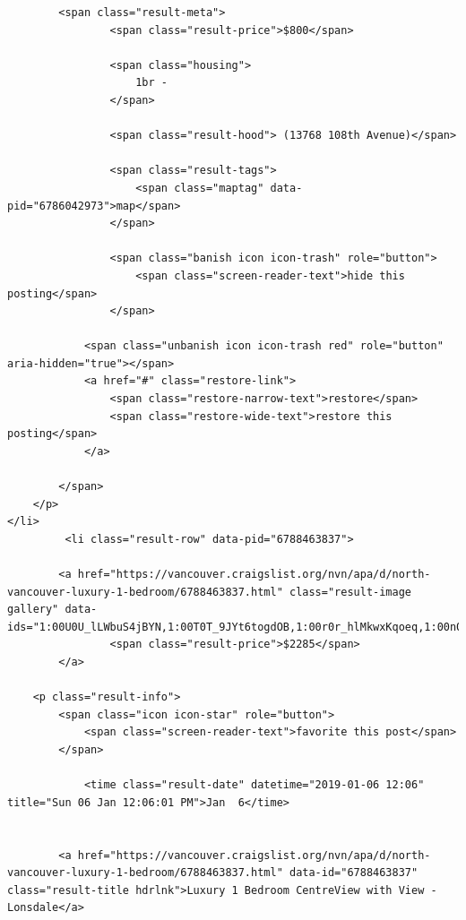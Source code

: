 \documentclass[
]{krantz}
\begin{document}
\begin{verbatim}
        <span class="result-meta">
                <span class="result-price">$800</span>

                <span class="housing">
                    1br -
                </span>

                <span class="result-hood"> (13768 108th Avenue)</span>

                <span class="result-tags">
                    <span class="maptag" data-pid="6786042973">map</span>
                </span>

                <span class="banish icon icon-trash" role="button">
                    <span class="screen-reader-text">hide this posting</span>
                </span>

            <span class="unbanish icon icon-trash red" role="button" aria-hidden="true"></span>
            <a href="#" class="restore-link">
                <span class="restore-narrow-text">restore</span>
                <span class="restore-wide-text">restore this posting</span>
            </a>

        </span>
    </p>
</li>
         <li class="result-row" data-pid="6788463837">

        <a href="https://vancouver.craigslist.org/nvn/apa/d/north-vancouver-luxury-1-bedroom/6788463837.html" class="result-image gallery" data-ids="1:00U0U_lLWbuS4jBYN,1:00T0T_9JYt6togdOB,1:00r0r_hlMkwxKqoeq,1:00n0n_2U8StpqVRYX,1:00M0M_e93iEG4BRAu,1:00a0a_PaOxz3JIfI,1:00o0o_4VznEcB0NC5,1:00V0V_1xyllKkwa9A,1:00G0G_lufKMygCGj6,1:00202_lutoxKbVTcP,1:00R0R_cQFYHDzGrOK,1:00000_hTXSBn1SrQN,1:00r0r_2toXdps0bT1,1:01616_dbAnv07FaE7,1:00g0g_1yOIckt0O1h,1:00m0m_a9fAvCYmO9L,1:00C0C_8EO8Yl1ELUi,1:00I0I_iL6IqV8n5MB,1:00b0b_c5e1FbpbWUZ,1:01717_6lFcmuJ2glV">
                <span class="result-price">$2285</span>
        </a>

    <p class="result-info">
        <span class="icon icon-star" role="button">
            <span class="screen-reader-text">favorite this post</span>
        </span>

            <time class="result-date" datetime="2019-01-06 12:06" title="Sun 06 Jan 12:06:01 PM">Jan  6</time>


        <a href="https://vancouver.craigslist.org/nvn/apa/d/north-vancouver-luxury-1-bedroom/6788463837.html" data-id="6788463837" class="result-title hdrlnk">Luxury 1 Bedroom CentreView with View - Lonsdale</a>

\end{verbatim}
\end{document}
